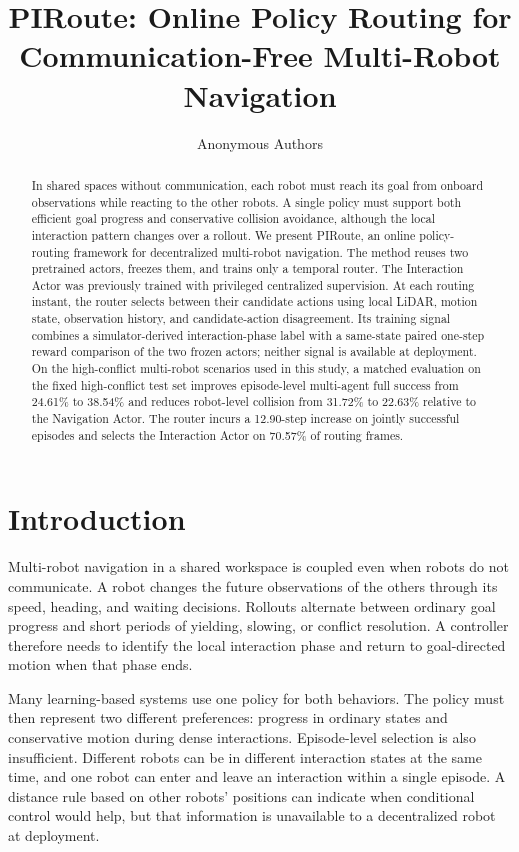 \documentclass[letterpaper,10pt,conference]{ieeeconf}
\title{PIRoute: Online Policy Routing for Communication-Free Multi-Robot Navigation}
\author{Anonymous Authors}
\newcommand{\method}{PIRoute}
\begin{document}
\maketitle
\thispagestyle{empty}
\pagestyle{empty}

\begin{abstract}
In shared spaces without communication, each robot must reach its goal from onboard observations while reacting to the other robots. A single policy must support both efficient goal progress and conservative collision avoidance, although the local interaction pattern changes over a rollout. We present \method, an online policy-routing framework for decentralized multi-robot navigation. The method reuses two pretrained actors, freezes them, and trains only a temporal router. The Interaction Actor was previously trained with privileged centralized supervision. At each routing instant, the router selects between their candidate actions using local LiDAR, motion state, observation history, and candidate-action disagreement. Its training signal combines a simulator-derived interaction-phase label with a same-state paired one-step reward comparison of the two frozen actors; neither signal is available at deployment. On the high-conflict multi-robot scenarios used in this study, a matched evaluation on the fixed high-conflict test set improves episode-level multi-agent full success from 24.61\% to 38.54\% and reduces robot-level collision from 31.72\% to 22.63\% relative to the Navigation Actor. The router incurs a 12.90-step increase on jointly successful episodes and selects the Interaction Actor on 70.57\% of routing frames.
\end{abstract}

\section{Introduction}
Multi-robot navigation in a shared workspace is coupled even when robots do not communicate. A robot changes the future observations of the others through its speed, heading, and waiting decisions. Rollouts alternate between ordinary goal progress and short periods of yielding, slowing, or conflict resolution. A controller therefore needs to identify the local interaction phase and return to goal-directed motion when that phase ends.

Many learning-based systems use one policy for both behaviors. The policy must then represent two different preferences: progress in ordinary states and conservative motion during dense interactions. Episode-level selection is also insufficient. Different robots can be in different interaction states at the same time, and one robot can enter and leave an interaction within a single episode. A distance rule based on other robots' positions can indicate when conditional control would help, but that information is unavailable to a decentralized robot at deployment.
\end{document}

